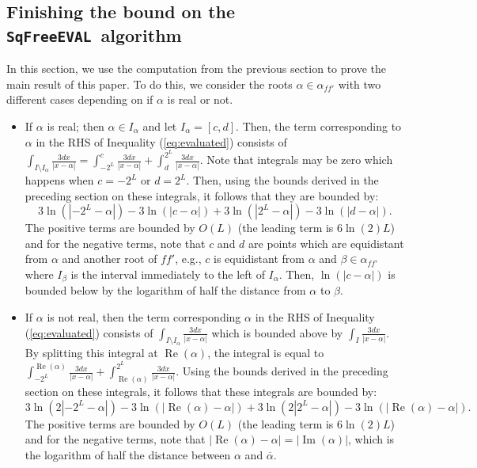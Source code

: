 \documentclass{amsart}
\theoremstyle{definition}
\DeclareMathOperator{\Real}{Re}
\DeclareMathOperator{\Imag}{Im}
\newcommand{\EVAL}{\texttt{SqFreeEVAL}}
\begin{document}
\subsection{Finishing the bound on the \EVAL\ algorithm}\label{subsec:EVALbounds}
In this section, we use the computation from the previous section to prove the main result of this paper.  To do this, we consider the roots $\alpha\in\alpha_{f\! f'}$ with two different cases depending on if $\alpha$ is real or not.
\begin{itemize}
\item If $\alpha$ is real; then $\alpha\in I_\alpha$ and let $I_\alpha=[c,d]$.  Then, the term corresponding to $\alpha$ in the RHS of Inequality (\ref{eq:evaluated}) consists of $\int_{I\setminus I_{\alpha}}\frac{3dx}{|x-\alpha|}=\int_{-2^L}^c\frac{3dx}{|x-\alpha|}+\int_d^{2^L}\frac{3dx}{|x-\alpha|}$.  Note that integrals may be zero which happens when $c=-2^L$ or $d=2^L$.  Then, using the bounds derived in the preceding section on these integrals, it follows that they are bounded by:
    $$3\ln(|-2^L-\alpha|)-3\ln(|c-\alpha|)+3\ln(|2^L-\alpha|)-3\ln(|d-\alpha|).$$
    The positive terms are bounded by $O(L)$ (the leading term is $6\ln (2)L$) and for the negative terms, note that $c$ and $d$ are points which are equidistant from $\alpha$ and another root of $f\!f'$, e.g., $c$ is equidistant from $\alpha$ and $\beta\in\alpha_{f\!f'}$ where $I_\beta$ is the interval immediately to the left of $I_\alpha$.  Then, $\ln(|c-\alpha|)$ is bounded below by the logarithm of half the distance from $\alpha$ to $\beta$.
\item If $\alpha$ is not real, then the term corresponding $\alpha$ in the RHS of Inequality (\ref{eq:evaluated}) consists of $\int_{I\setminus I_{\alpha}}\frac{3dx}{|x-\alpha|}$ which is bounded above by $\int_I\frac{3dx}{|x-\alpha|}$.  By splitting this integral at $\Real(\alpha)$, the integral is equal to $\int_{-2^L}^{\Real(\alpha)}\frac{3dx}{|x-\alpha|}+\int_{\Real(\alpha)}^{2^L}\frac{3dx}{|x-\alpha|}$. Using the bounds derived in the preceding section on these integrals, it follows that these integrals are bounded by:
    $$3\ln(2|-2^L-\alpha|)-3\ln(|\Real(\alpha)-\alpha|)+3\ln(2|2^L-\alpha|)-3\ln(|\Real(\alpha)-\alpha|).$$
    The positive terms are bounded by $O(L)$ (the leading term is $6\ln(2)L$) and for the negative terms, note that $|\Real(\alpha)-\alpha|=|\Imag(\alpha)|$, which is the logarithm of half the distance between $\alpha$ and $\overline{\alpha}$.
\end{itemize}
\end{document}
